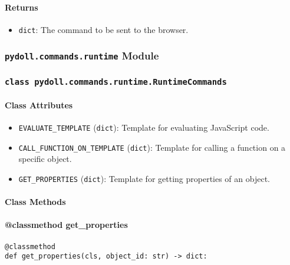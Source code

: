 \documentclass{article}
\begin{document}
\paragraph{Returns}

\begin{itemize}
    \item \lstinline[style=pythonstyle]|dict|: The command to be sent to the browser.
\end{itemize}

\subsubsection*{\texttt{pydoll.commands.runtime} Module}

\subsubsection*{\texttt{class pydoll.commands.runtime.RuntimeCommands}}

\paragraph{Class Attributes}

\begin{itemize}
    \item \lstinline[style=pythonstyle]|EVALUATE_TEMPLATE| (\lstinline[style=pythonstyle]|dict|): Template for evaluating JavaScript code.
    \item \lstinline[style=pythonstyle]|CALL_FUNCTION_ON_TEMPLATE| (\lstinline[style=pythonstyle]|dict|): Template for calling a function on a specific object.
    \item \lstinline[style=pythonstyle]|GET_PROPERTIES| (\lstinline[style=pythonstyle]|dict|): Template for getting properties of an object.
\end{itemize}

\paragraph{Class Methods}
\paragraph{@classmethod get\_properties}

\begin{lstlisting}[style=pythonstyle]
@classmethod
def get_properties(cls, object_id: str) -> dict:
\end{lstlisting}
\end{document}
